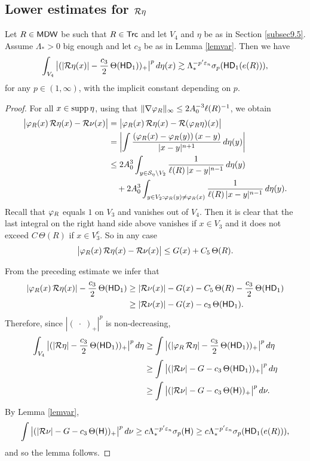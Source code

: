 \vv

\subsection{Lower estimates for \texorpdfstring{${\mathcal R}\eta$}{R\_eta}}

\begin{lemma}\label{lemrieszeta}
Let $R\in{\mathsf{MDW}}$ be such that $R\in{\mathsf{Trc}}$ and let $V_4$ and $\eta$ be as in Section \ref{subsec9.5}.
Assume $\Lambda_*>0$ big enough and let $c_3$ be as in Lemma \ref{lemvar}.
Then we have
$$\int_{V_4} \big|(|{\mathcal R}\eta(x)| - \frac{c_3}2\,\Theta({\mathsf{HD}}_1))_+\big|^p\,d\eta(x) \gtrsim \Lambda_*^{-p'{\varepsilon}_n}\sigma_p({\mathsf{HD}}_1(e(R))),$$
for any $p\in (1,\infty)$, with the implicit constant depending on $p$.
\end{lemma}

\begin{proof}
For all $x\in \operatorname{supp}\eta$, using that $\|\nabla{\varphi}_R\|_\infty\leq 2A_0^{-3}\ell(R)^{-1}$, we obtain
\begin{align*}
\big|{\varphi}_R(x)\,{\mathcal R}\eta(x) - {\mathcal R}\nu(x)\big| &= \big|{\varphi}_R(x)\,{\mathcal R}\eta(x) - {\mathcal R}({\varphi}_R\eta)(x)\big|\\
& = \left|\int \frac{({\varphi}_R(x) - {\varphi}_R(y))\,(x-y)}{|x-y|^{n+1}}\,d\eta(y)\right|\\
& \leq 2A_0^3\int_{y\in {\mathcal S}_\eta\setminus V_2} \frac1{\ell(R)\,|x-y|^{n-1}}\,d\eta(y)\\
&\quad +
2A_0^3\int_{y\in V_2:{\varphi}_R(y)\neq {\varphi}_R(x)} \frac1{\ell(R)\,|x-y|^{n-1}}\,d\eta(y).
\end{align*}
Recall that ${\varphi}_R$ equals $1$ on $V_3$ and vanishes out of $V_4$.
Then it is clear that the last integral on the right hand side above vanishes if $x\in V_3$ and
it does not exceed $C\,\Theta(R)$ if $x\in V_3^c$.
So in any case
$$\big|{\varphi}_R(x)\,{\mathcal R}\eta(x) - {\mathcal R}\nu(x)\big|\leq G(x) + C_5\,\Theta(R).$$

From the preceding estimate we infer that
\begin{align*}
|{\varphi}_R(x)\,{\mathcal R}\eta(x)| - \frac{c_3}2\,\Theta({\mathsf{HD}}_1) & \geq 
|{\mathcal R}\nu(x)| - G(x) - C_5\,\Theta(R)
- \frac{c_3}2\,\Theta({\mathsf{HD}}_1)\\
& \geq |{\mathcal R}\nu(x)| - G(x) 
- c_3\,\Theta({\mathsf{HD}}_1).
\end{align*}
Therefore, since $|(\;\cdot\;)_+|^p$ is non-decreasing,
\begin{align*}
\int_{V_4} \big|(|{\mathcal R}\eta| - \frac{c_3}2\,\Theta({\mathsf{HD}}_1))_+\big|^p\,d\eta & 
\geq \int \big|(|{\varphi}_R\,{\mathcal R}\eta| - \frac{c_3}2\,\Theta({\mathsf{HD}}_1))_+\big|^p\,d\eta\\
& \geq \int  \big|(|{\mathcal R}\nu| - G 
- c_3\,\Theta({\mathsf{HD}}_1))_+\big|^p\,d\eta\\
& \geq \int  \big|(|{\mathcal R}\nu| - G 
- c_3\,\Theta({\mathsf{H}}))_+\big|^p\,d\nu.
\end{align*}
By Lemma \ref{lemvar}, %
$$\int  \big|(|{\mathcal R}\nu| - G 
- c_3\,\Theta({\mathsf{H}}))_+\big|^p\,d\nu\geq c \Lambda_*^{-p'{\varepsilon}_n}\sigma_p({\mathsf{H}})\geq c\Lambda_*^{-p'{\varepsilon}_n}\sigma_p({\mathsf{HD}}_1(e(R))),$$
and so the lemma follows.
\end{proof}
\vv






